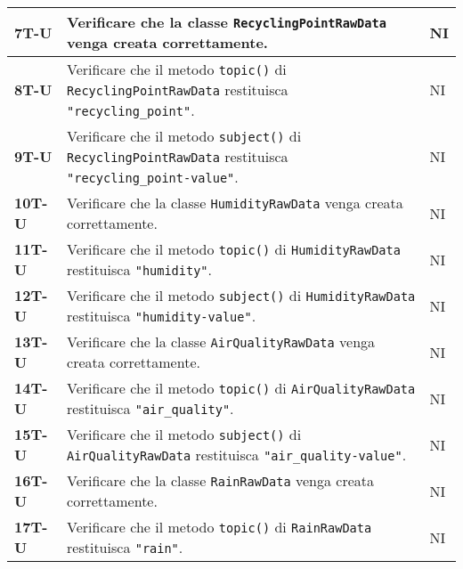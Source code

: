 \begin{longtable}{|>{\raggedright\arraybackslash}m{}|>{\raggedright\arraybackslash}m{}|>{\raggedright\arraybackslash}m{}|}
	\hline
	\textbf{7T-U}   & Verificare che la classe \texttt{RecyclingPointRawData} venga creata correttamente.                                                                               & NI             \\
	\hline
	\textbf{8T-U}   & Verificare che il metodo \texttt{topic()} di \texttt{RecyclingPointRawData} restituisca \texttt{"recycling\_point"}.                                              & NI             \\
	\hline
	\textbf{9T-U}   & Verificare che il metodo \texttt{subject()} di \texttt{RecyclingPointRawData} restituisca \texttt{"recycling\_point-value"}.                                      & NI             \\
	\hline
	\textbf{10T-U}  & Verificare che la classe \texttt{HumidityRawData} venga creata correttamente.                                                                                     & NI             \\
	\hline
	\textbf{11T-U}  & Verificare che il metodo \texttt{topic()} di \texttt{HumidityRawData} restituisca \texttt{"humidity"}.                                                            & NI             \\
	\hline
	\textbf{12T-U}  & Verificare che il metodo \texttt{subject()} di \texttt{HumidityRawData} restituisca \texttt{"humidity-value"}.                                                    & NI             \\
	\hline
	\textbf{13T-U}  & Verificare che la classe \texttt{AirQualityRawData} venga creata correttamente.                                                                                   & NI             \\
	\hline
	\textbf{14T-U}  & Verificare che il metodo \texttt{topic()} di \texttt{AirQualityRawData} restituisca \texttt{"air\_quality"}.                                                      & NI             \\
	\hline
	\textbf{15T-U}  & Verificare che il metodo \texttt{subject()} di \texttt{AirQualityRawData} restituisca \texttt{"air\_quality-value"}.                                              & NI             \\
	\hline
	\textbf{16T-U}  & Verificare che la classe \texttt{RainRawData} venga creata correttamente.                                                                                         & NI             \\
	\hline
	\textbf{17T-U}  & Verificare che il metodo \texttt{topic()} di \texttt{RainRawData} restituisca \texttt{"rain"}.                                                                    & NI             \\

\end{longtable}
